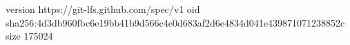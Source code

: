 version https://git-lfs.github.com/spec/v1
oid sha256:4d3db960fbc6e19bb41b9d566c4e0d683af2d6e4834d041e439871071238852c
size 175024

